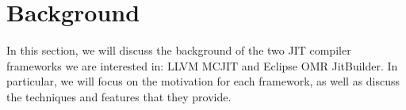 \section{Background}
In this section, we will discuss the background of the two JIT compiler frameworks we are interested in: LLVM MCJIT and Eclipse OMR JitBuilder.
In particular, we will focus on the motivation for each framework, as well as discuss the techniques and features that they provide.

